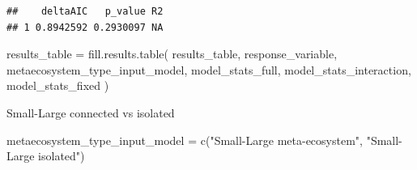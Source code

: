 \documentclass[
]{article}
\newenvironment{Shaded}{\begin{snugshade}}{\end{snugshade}}
\newcommand{\FunctionTok}[1]{\textcolor[rgb]{0.00,0.00,0.00}{#1}}
\newcommand{\NormalTok}[1]{#1}
\newcommand{\OtherTok}[1]{\textcolor[rgb]{0.56,0.35,0.01}{#1}}
\newcommand{\StringTok}[1]{\textcolor[rgb]{0.31,0.60,0.02}{#1}}
\begin{document}
\begin{verbatim}
##    deltaAIC   p_value R2
## 1 0.8942592 0.2930097 NA
\end{verbatim}

\begin{Shaded}
\begin{Highlighting}[]
\NormalTok{results\_table }\OtherTok{=} \FunctionTok{fill.results.table}\NormalTok{(}
\NormalTok{  results\_table,}
\NormalTok{  response\_variable,}
\NormalTok{  metaecosystem\_type\_input\_model,}
\NormalTok{  model\_stats\_full,}
\NormalTok{  model\_stats\_interaction,}
\NormalTok{  model\_stats\_fixed}
\NormalTok{)}
\end{Highlighting}
\end{Shaded}

Small-Large connected vs isolated

\begin{Shaded}
\begin{Highlighting}[]
\NormalTok{metaecosystem\_type\_input\_model }\OtherTok{=} \FunctionTok{c}\NormalTok{(}\StringTok{"Small{-}Large meta{-}ecosystem"}\NormalTok{,}
                                   \StringTok{"Small{-}Large isolated"}\NormalTok{)}
\end{Highlighting}
\end{Shaded}
\end{document}
